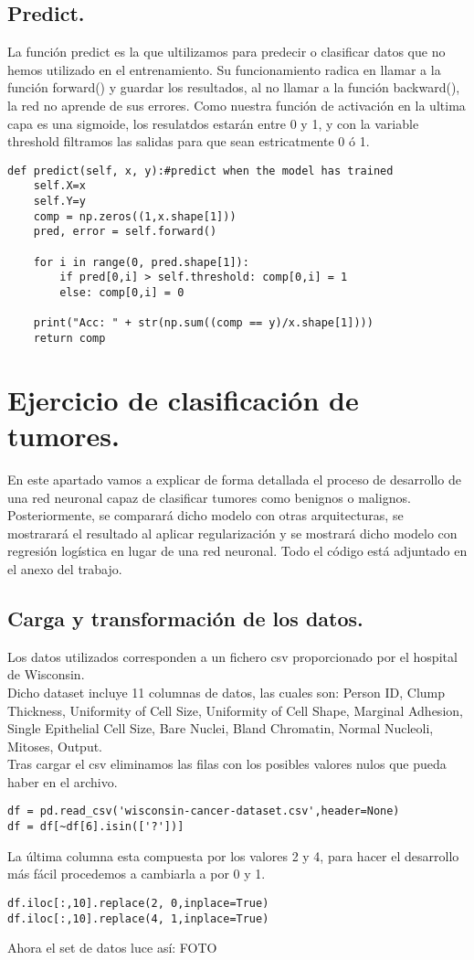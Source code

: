 \documentclass[a4paper,10pt]{article}
\begin{document}
\subsection{Predict.}
\noindent
La función predict es la que ultilizamos para predecir o clasificar datos que no hemos utilizado en el entrenamiento. Su funcionamiento radica en llamar a la función forward() y guardar los resultados, al no llamar a la función backward(), la red no aprende de sus errores. Como nuestra función de activación en la ultima capa es una sigmoide, los resulatdos estarán entre 0 y 1, y con la variable threshold filtramos las salidas para que sean estricatmente 0 ó 1.  
\begin{lstlisting}
def predict(self, x, y):#predict when the model has trained
    self.X=x
    self.Y=y
    comp = np.zeros((1,x.shape[1]))
    pred, error = self.forward()    
    
    for i in range(0, pred.shape[1]):
        if pred[0,i] > self.threshold: comp[0,i] = 1
        else: comp[0,i] = 0
    
    print("Acc: " + str(np.sum((comp == y)/x.shape[1]))) 
    return comp
\end{lstlisting}
\newpage
\section{Ejercicio de clasificación de tumores.}
En este apartado vamos a explicar de forma detallada el proceso de desarrollo de una red neuronal capaz de clasificar tumores como benignos o malignos. Posteriormente, se comparará dicho modelo con otras arquitecturas, se mostrarará el resultado al aplicar regularización y se mostrará dicho modelo con regresión logística en lugar de una red neuronal. Todo el código está adjuntado en el anexo del trabajo.
\subsection{Carga y transformación de los datos.}
Los datos utilizados corresponden a un fichero csv proporcionado por el hospital de Wisconsin.\\
Dicho dataset incluye 11 columnas de datos, las cuales son: Person ID, Clump Thickness, Uniformity of Cell Size, Uniformity of Cell Shape, Marginal Adhesion, Single Epithelial Cell Size, Bare Nuclei, Bland Chromatin, Normal Nucleoli, Mitoses, Output.\\
Tras cargar el csv eliminamos las filas con los posibles valores nulos que pueda haber en el archivo.
\begin{lstlisting}
df = pd.read_csv('wisconsin-cancer-dataset.csv',header=None)
df = df[~df[6].isin(['?'])]
\end{lstlisting}
La última columna esta compuesta por los valores 2 y 4,  para hacer el desarrollo más fácil procedemos a cambiarla a por 0 y 1.
\begin{lstlisting}
df.iloc[:,10].replace(2, 0,inplace=True)
df.iloc[:,10].replace(4, 1,inplace=True)
\end{lstlisting}
Ahora el set de datos luce así: FOTO
\end{document}
